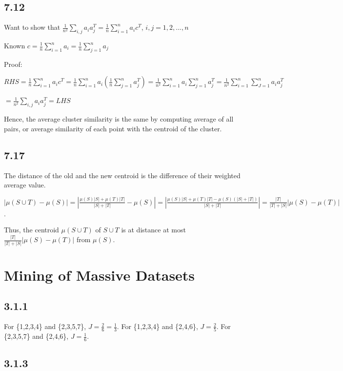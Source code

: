 \documentclass[a4paper, 11pt]{article}
\begin{document}
\subsection*{7.12}

Want to show that $\frac{1}{n^2} \sum_{i,j} a_i a_j^T = \frac{1}{n} \sum_{i=1}^n a_i c^T$, $i,j = 1, 2, ..., n$

Known $c = \frac{1}{n} \sum_{i = 1}^n a_i = \frac{1}{n} \sum_{j = 1}^n a_j$

Proof:

$RHS = \frac{1}{n} \sum_{i=1}^n a_i c^T = \frac{1}{n} \sum_{i=1}^n a_i (\frac{1}{n} \sum_{j = 1}^n a_j^T) = \frac{1}{n^2} \sum_{i=1}^n a_i \sum_{j=1}^n a_j^T = \frac{1}{n^2} \sum_{i=1}^n \sum_{J=1}^n a_i a_j^T $

$= \frac{1}{n^2} \sum_{i,j} a_i a_j^T = LHS$

Hence, the average cluster similarity is the same by computing average of all pairs, or average similarity of each point with the centroid of the cluster.

\subsection*{7.17}

The distance of the old and the new centroid is the difference of their weighted average value.

$|\mu (S \cup T) - \mu (S)| = |\frac{\mu (S) |S| + \mu (T) |T|}{|S| + |T|} - \mu (S)| = |\frac{\mu (S) |S| + \mu (T) |T| - \mu (S) (|S| + |T|)}{|S| + |T|}| = \frac{|T|}{|T|+|S|} |\mu (S) - \mu (T)|$.

Thus, the centroid $\mu (S \cup T)$ of $S \cup T$ is at distance at most $\frac{|T|}{|T|+|S|} |\mu (S) - \mu (T)|$ from $\mu (S)$.


\section*{Mining of Massive Datasets}

\subsection*{3.1.1}

For \{1,2,3,4\} and \{2,3,5,7\},  $J = \frac{2}{6} = \frac{1}{3}$. For \{1,2,3,4\} and \{2,4,6\}, $J = \frac{2}{5}$. For \{2,3,5,7\} and \{2,4,6\},  $J = \frac{1}{6}$.

\subsection*{3.1.3}
\end{document}
